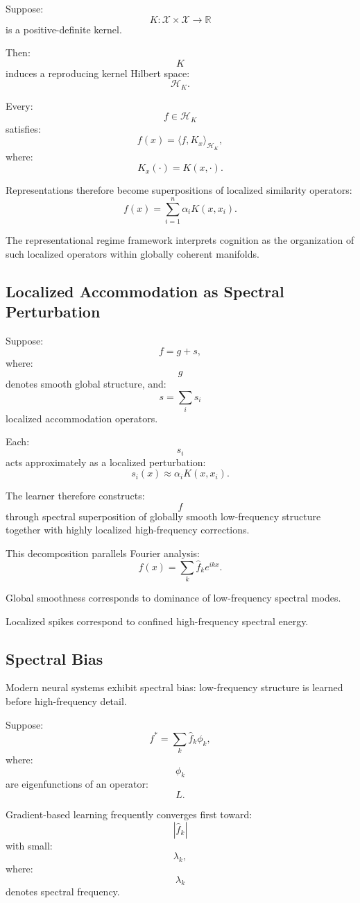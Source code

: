 \documentclass[12pt,a4paper]{article}
\begin{document}
Suppose:
\[
K :
\mathcal{X}\times\mathcal{X}
\rightarrow
\mathbb{R}
\]
is a positive-definite kernel.

Then:
\[
K
\]
induces a reproducing kernel Hilbert space:
\[
\mathcal{H}_K.
\]

Every:
\[
f
\in
\mathcal{H}_K
\]
satisfies:
\[
f(x)
=
\langle
f,
K_x
\rangle_{\mathcal{H}_K},
\]
where:
\[
K_x(\cdot)
=
K(x,\cdot).
\]

Representations therefore become superpositions of localized similarity operators:
\[
f(x)
=
\sum_{i=1}^n
\alpha_i
K(x,x_i).
\]

The representational regime framework interprets cognition as the organization of such localized operators within globally coherent manifolds.

\subsection{Localized Accommodation as Spectral Perturbation}

Suppose:
\[
f
=
g+s,
\]
where:
\[
g
\]
denotes smooth global structure,
and:
\[
s
=
\sum_i s_i
\]
localized accommodation operators.

Each:
\[
s_i
\]
acts approximately as a localized perturbation:
\[
s_i(x)
\approx
\alpha_i
K(x,x_i).
\]

The learner therefore constructs:
\[
f
\]
through spectral superposition of globally smooth low-frequency structure together with highly localized high-frequency corrections.

This decomposition parallels Fourier analysis:
\[
f(x)
=
\sum_k
\hat{f}_k
e^{ikx}.
\]

Global smoothness corresponds to dominance of low-frequency spectral modes.

Localized spikes correspond to confined high-frequency spectral energy.

\subsection{Spectral Bias}

Modern neural systems exhibit spectral bias:
low-frequency structure is learned before high-frequency detail.

Suppose:
\[
f^\ast
=
\sum_k
\hat{f}_k
\phi_k,
\]
where:
\[
\phi_k
\]
are eigenfunctions of an operator:
\[
L.
\]

Gradient-based learning frequently converges first toward:
\[
|\hat{f}_k|
\]
with small:
\[
\lambda_k,
\]
where:
\[
\lambda_k
\]
denotes spectral frequency.
\end{document}
